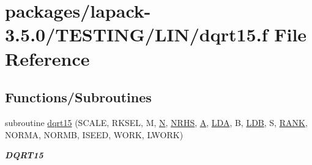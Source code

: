 \hypertarget{dqrt15_8f}{}\section{packages/lapack-\/3.5.0/\+T\+E\+S\+T\+I\+N\+G/\+L\+I\+N/dqrt15.f File Reference}
\label{dqrt15_8f}
\subsection*{Functions/\+Subroutines}
\begin{DoxyCompactItemize}
\item 
subroutine \hyperlink{group__double__lin_ga2b2e3ad97569e899c170e6f18f7a8776}{dqrt15} (S\+C\+A\+L\+E, R\+K\+S\+E\+L, M, \hyperlink{polmisc_8c_a0240ac851181b84ac374872dc5434ee4}{N}, \hyperlink{example__user_8c_aa0138da002ce2a90360df2f521eb3198}{N\+R\+H\+S}, \hyperlink{classA}{A}, \hyperlink{example__user_8c_ae946da542ce0db94dced19b2ecefd1aa}{L\+D\+A}, B, \hyperlink{example__user_8c_a50e90a7104df172b5a89a06c47fcca04}{L\+D\+B}, S, \hyperlink{splinemodule_8c_a3a88bcc63386de30443dacede2e01847}{R\+A\+N\+K}, N\+O\+R\+M\+A, N\+O\+R\+M\+B, I\+S\+E\+E\+D, W\+O\+R\+K, L\+W\+O\+R\+K)
\begin{DoxyCompactList}\small\item\em {\bfseries D\+Q\+R\+T15} \end{DoxyCompactList}\end{DoxyCompactItemize}
